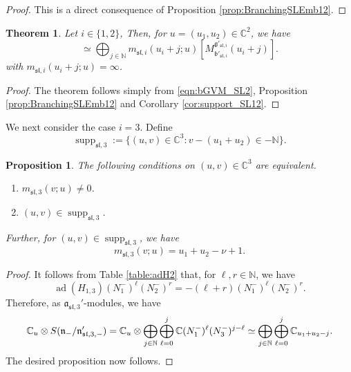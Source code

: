 \documentclass[a4paper,11pt,reqno]{amsart}
\newcommand{\fraka}{\mathfrak{a}}
\newcommand{\frakg}{\mathfrak{g}}
\newcommand{\frakn}{\mathfrak{n}}
\newcommand{\CC}{\mathbb{C}}
\newcommand{\0}{{\bf 0}}
\newcommand{\N}{\mathbb{N}}
\newcommand{\C}{\mathbb{C}}
\newcommand{\1}{{\bf 1}}
\DeclareMathOperator{\ad}{ad}
\newcommand{\frakb}{{\mathfrak b}}
\DeclareMathOperator{\supp}{supp}
\newcommand{\fraksl}{{\mathfrak{sl}}}
\newcommand{\Mbsl}{M^{\frakg_{\fraksl}}_{\frakb_{\fraksl}}}
\theoremstyle{plain}
\newtheorem{theorem}[equation]{Theorem}
\newtheorem{proposition}[equation]{Proposition}
\theoremstyle{definition}
\numberwithin{equation}{section}
\theoremstyle{definition}
\begin{document}
\begin{proof}
This is a direct consequence of 
Proposition \ref{prop:BranchingSLEmb12}.
\end{proof}

\begin{theorem}\label{thm:BranchingEmb_SL12}
Let $i \in \{1,2\}$, 
Then, for $u=(u_1, u_2) \in \CC^2$,
we have
\begin{equation*}
[\Mbsl(u)\vert_{\frakg_{\fraksl,i}'}]
\simeq 
\bigoplus_{j \in \N}
m_{\fraksl,i}(u_i+j;u)
[M^{\frakg'_{\fraksl,i}}_{\frakb'_{\fraksl,i}}(u_i + j)].
\end{equation*}
with $m_{\fraksl,i}(u_i+j;u)=\infty$.
\end{theorem}

\begin{proof}
The theorem follows simply from 
\eqref{eqn:bGVM_SL2}, 
Proposition \ref{prop:BranchingSLEmb12} and
Corollary \ref{cor:support_SL12}.
\end{proof}

We next consider the case $i=3$.
Define
\begin{equation}\label{eqn:supp_3_sl}
\supp_{\fraksl,3} 
:= \{(u, v) \in \C^3: v -(u_1+u_2) \in -\N\}.
\end{equation}

\begin{proposition}\label{prop:BranchingSLEmb3}
The following conditions on 
$(u, v) \in \CC^3$ are 
equivalent.
\begin{enumerate}[label=\normalfont{(\roman*)}]
\item
$m_{\fraksl,3}(v;u) \neq 0$.
\vspace{3pt}
\item 
$(u,v) \in \supp_{\fraksl,3}$.
\end{enumerate}
Further, for $(u,v) \in \supp_{\fraksl,3}$, we have 
\begin{equation*}
m_{\fraksl,3}(v;u) = u_1+u_2-\nu+1.
\end{equation*}
\end{proposition}

\begin{proof}
It follows from Table \ref{table:adH2} that, for $\ell, r \in \N$, we have
\begin{equation*}
\ad(H_{1,3})(N_1^-)^\ell(N_2^-)^r=-(\ell+r)(N_1^-)^\ell(N_2^-)^r.
\end{equation*}
Therefore, as $\fraka_{\fraksl,3}'$-modules, we have 
\begin{equation*}
\C_u \otimes
S(\frakn_-/\frakn_{\fraksl, 3,-}') 
= \C_u \otimes \bigoplus_{j \in \N} \bigoplus_{\ell=0}^j
\C(N_1^-)^\ell(N_3^-)^{j-\ell}\\[3pt]
\simeq
\bigoplus_{j \in \N} \bigoplus_{\ell=0}^j
\C_{u_1+u_2-j}.
\end{equation*}
The desired proposition now follows.
\end{proof}
\end{document}
